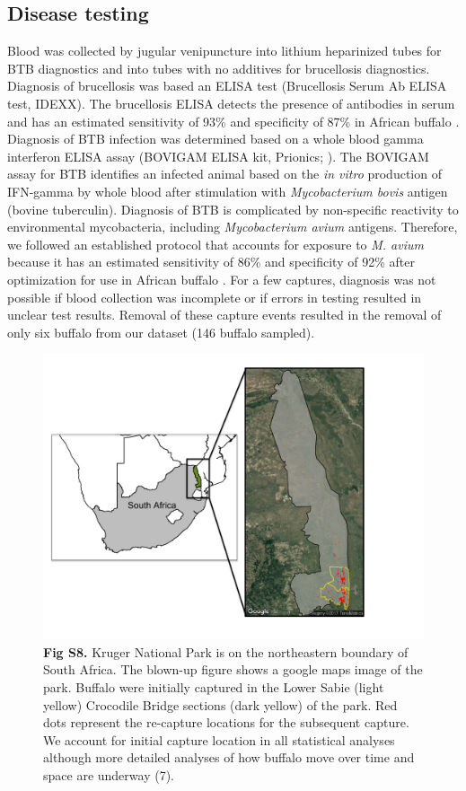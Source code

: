 \documentclass[10pt,letterpaper]{article}
\begin{document}
\subsection*{Disease testing}
Blood was collected by jugular venipuncture into lithium heparinized tubes for BTB diagnostics and into tubes with no additives for brucellosis diagnostics. Diagnosis of brucellosis was based an ELISA test (Brucellosis Serum Ab ELISA test, IDEXX). The brucellosis ELISA detects the presence of antibodies in serum and has an estimated sensitivity of 93\% and specificity of 87\% in African buffalo \cite{gorsich_evaluation_2015}. Diagnosis of BTB infection was determined based on a whole blood gamma interferon ELISA assay (BOVIGAM ELISA kit, Prionics; \cite{michel_approaches_2011}). The BOVIGAM assay for BTB identifies an infected animal based on the \textit{in vitro} production of IFN-gamma by whole blood after stimulation with \textit{Mycobacterium bovis} antigen (bovine tuberculin). Diagnosis of BTB is complicated by non-specific reactivity to environmental mycobacteria, including \textit{Mycobacterium avium} antigens. Therefore, we followed an established protocol that accounts for exposure to \textit{M. avium} because it has an estimated sensitivity of 86\% and specificity of 92\% after optimization for use in African buffalo \cite{michel_approaches_2011}. For a few captures, diagnosis was not possible if blood collection was incomplete or if errors in testing resulted in unclear test results. Removal of these capture events resulted in the removal of only six buffalo from our dataset (146 buffalo sampled).

\begin{figure}
\centering
\includegraphics[width=.99\linewidth]{Figure_S8.pdf}
\caption*{\textbf{Fig S8.} Kruger National Park is on the northeastern boundary of South Africa.  The blown-up figure shows a google maps image of the park. Buffalo were initially captured in the Lower Sabie (light yellow) Crocodile Bridge sections (dark yellow) of the park. Red dots represent the re-capture locations for the subsequent capture. We account for initial capture location in all statistical analyses although more detailed analyses of how buffalo move over time and space are underway (7).}
\label{fig:figS8}
\end{figure}

\clearpage
\pagebreak




\end{document}
